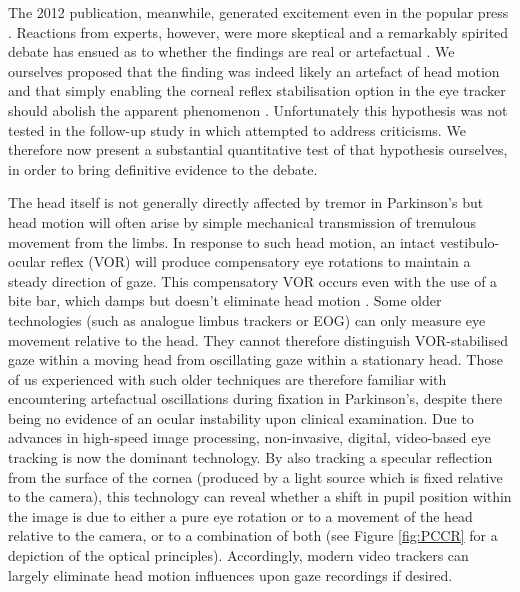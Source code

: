 \documentclass[jou,a4paper]{apa6}
\begin{document}
 The 2012 publication, meanwhile, generated excitement even in the popular press \citep{In-Brief2012Ocular-Tremor-i,Phend2012Eye-tremors-may}. Reactions from experts, however, were more skeptical and a remarkably spirited debate has ensued as to whether the findings are real or artefactual \citep{Baron2013Ocular-tremor-i,Baron2014Scientific-data,Bronstein2014EYEE:-exciting-,Duval2013Ocular-tremor-i,Gitchel2014Experimental-su,Kaski2013Eye-oscillation,Kaski2013Ocular-tremor-i,Leigh2013Tremor-of-the-e,MacAskill2013Ocular-Tremor-i,Saifee2014Tremor-of-the-e,Willard2014Ocular-motor-di}. We ourselves proposed that the finding was indeed likely an artefact of head motion and that simply enabling the corneal reflex stabilisation option in the eye tracker should abolish the apparent phenomenon \citep{MacAskill2013Ocular-Tremor-i}. Unfortunately this hypothesis was not tested in the follow-up study in which \citet{Gitchel2014Experimental-su} attempted to address criticisms. We therefore now present a substantial quantitative test of that hypothesis ourselves, in order to bring definitive evidence to the debate.
 
The head itself is not generally directly affected by tremor in Parkinson's but head motion will often arise by simple mechanical transmission of tremulous movement from the limbs. In response to such head motion, an intact vestibulo-ocular reflex (VOR) will produce compensatory eye rotations to maintain a steady direction of gaze. This compensatory VOR occurs even with the use of a bite bar, which damps but doesn't eliminate head motion \citep{Saifee2014Tremor-of-the-e}. Some older technologies (such as analogue limbus trackers or EOG) can only measure eye movement relative to the head. They cannot therefore distinguish VOR-stabilised gaze within a moving head from oscillating gaze within a stationary head. Those of us experienced with such older techniques \citep[e.g.][]{Anderson2008Oculomotor-func,Le-Heron2005Memory-guided-s,MacAskill2002Adaptive-modifi,MacAskill2002Saccadic-adapta} are therefore familiar with encountering artefactual oscillations during fixation in Parkinson's, despite there being no evidence of an ocular instability upon clinical examination. Due to advances in high-speed image processing, non-invasive, digital, video-based eye tracking is now the dominant technology. By also tracking a specular reflection from the surface of the cornea (produced by a light source which is fixed relative to the camera), this technology can reveal whether a shift in pupil position within the image is due to either a pure eye rotation or to a movement of the head relative to the camera, or to a combination of both (see Figure \ref{fig:PCCR} for a depiction of the optical principles). Accordingly, modern video trackers can largely eliminate head motion influences upon gaze recordings if desired.
\end{document}
